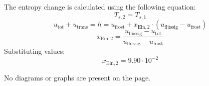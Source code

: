 The entropy change is calculated using the following equation:  
\[
T_{s,2} = T_{s,1}
\]  
\[
u_{\text{tot}} + u_{\text{trans}} = h = u_{\text{frost}} + x_{\text{Ein},2} \cdot (u_{\text{flüssig}} - u_{\text{frost}})
\]  
\[
x_{\text{Ein},2} = \frac{u_{\text{flüssig}} - u_{\text{tot}}}{u_{\text{flüssig}} - u_{\text{frost}}}
\]  
Substituting values:  
\[
x_{\text{Ein},2} = 9.90 \cdot 10^{-2}
\]  

No diagrams or graphs are present on the page.